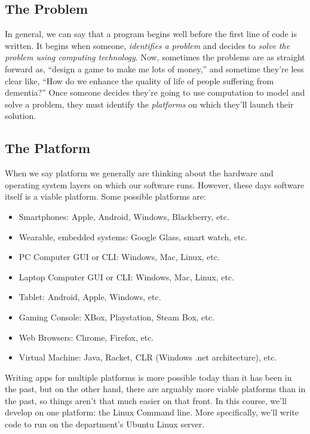 \documentclass[]{tufte-handout}
\begin{document}
\subsection{The Problem}

In general, we can say that a program begins well before the first line of code is written.  It begins when someone, \textit{identifies a problem} and decides to \textit{solve the problem using computing technology}.  Now, sometimes the problems are as straight forward as, ``design a game to make me lots of money,'' and sometime they're less clear like, ``How do we enhance the quality of life of people suffering from dementia?''  Once someone decides they're going to use computation to model and solve a problem, they must identify the \textit{platforms} on which they'll launch their solution.


\subsection{The Platform}

When we say platform we generally are thinking about the hardware and operating system layers on which our software runs. However, these days software itself is a viable platform.  Some possible platforms are:

\begin{itemize}
\item Smartphones: Apple, Android, Windows, Blackberry, etc.
\item Wearable, embedded systems: Google Glass, smart watch, etc.
\item PC Computer GUI or CLI: Windows, Mac, Linux, etc.
\item Laptop Computer GUI or CLI: Windows, Mac, Linux, etc.
\item Tablet: Android, Apple, Windows, etc.
\item Gaming Console: XBox, Playstation, Steam Box, etc.
\item Web Browsers: Chrome, Firefox, etc.
\item Virtual Machine: Java, Racket, CLR (Windows .net architecture), etc.
\end{itemize}

Writing apps for multiple platforms is more possible today than it has been in the past, but on the other hand, there are arguably more viable platforms than in the past, so things aren't that much easier on that front.  In this course, we'll develop on one platform: the Linux Command line. More specifically, we'll write code to run on the department's Ubuntu Linux server.  
\end{document}
